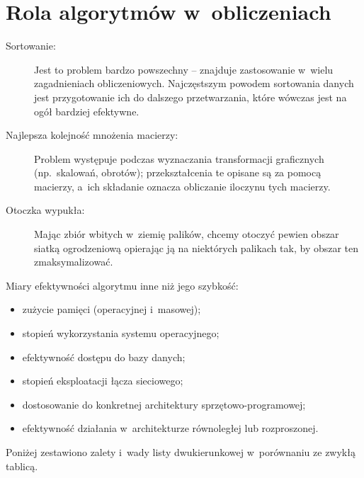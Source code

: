 \chapter{Rola algorytmów w~obliczeniach}


\exercise %
\begin{description}
	\item[Sortowanie:] Jest to problem bardzo powszechny -- znajduje zastosowanie w~wielu zagadnieniach obliczeniowych. Najczęstszym powodem sortowania danych jest przygotowanie ich do dalszego przetwarzania, które wówczas jest na ogół bardziej efektywne.
	\item[Najlepsza kolejność mnożenia macierzy:] Problem występuje podczas wyznaczania transformacji graficznych (np.\ skalowań, obrotów); przekształcenia te opisane są za pomocą macierzy, a~ich składanie oznacza obliczanie iloczynu tych macierzy.
	\item[Otoczka wypukła:] Mając zbiór wbitych w~ziemię palików, chcemy otoczyć pewien obszar siatką ogrodzeniową opierając ją na niektórych palikach tak, by obszar ten zmaksymalizować.
\end{description}

\exercise %
Miary efektywności algorytmu inne niż jego szybkość:
\begin{itemize}
	\item zużycie pamięci (operacyjnej i~masowej);
	\item stopień wykorzystania systemu operacyjnego;
	\item efektywność dostępu do bazy danych;
	\item stopień eksploatacji łącza sieciowego;
	\item dostosowanie do konkretnej architektury sprzętowo-programowej;
	\item efektywność działania w~architekturze równoległej lub rozproszonej.
\end{itemize}

\exercise %
Poniżej zestawiono zalety i~wady listy dwukierunkowej w~porównaniu ze zwykłą tablicą.

